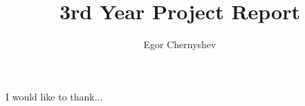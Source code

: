 \documentclass[12pt,BSc,wordcount,twoside]{muthesis}
\begin{document}

\title{3rd Year Project Report}
\author{Egor Chernyshev}

\beforeabstract



\afterabstract

I would like to thank...
\afterpreface











\appendix

\end{document}

